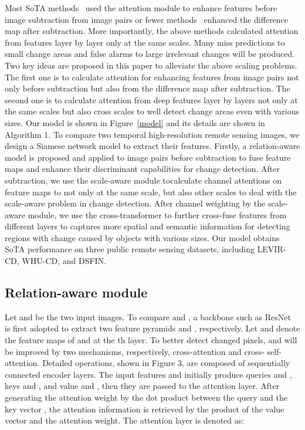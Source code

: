 \documentclass[letterpaper]{article} \usepackage{aaai23}  \usepackage{times}  \usepackage{helvet}  \usepackage{courier}  \usepackage[hyphens]{url}  \usepackage{graphicx} \urlstyle{rm} \def\UrlFont{\rm}  \usepackage{natbib}  \usepackage{caption} \frenchspacing  \setlength{\pdfpagewidth}{8.5in}  \setlength{\pdfpageheight}{11in}  \usepackage{algorithm}
\begin{document}
Most SoTA methods~\cite{Chen2022Transformers,chen2020spatial,DASNet2021} used the attention module to enhance features  before image subtraction from image pairs or fewer methods~\cite{Bai2022Edge} enhanced the difference map after subtraction.  More importantly, the above methods calculated attention from features layer by layer only at the same scales.  Many miss predictions to small change areas and false alarms to large irrelevant changes will be produced. Two key ideas are proposed in this paper to alleviate the above scaling problems.  The first one is to calculate attention for enhancing features from image pairs not only before subtraction but also from the difference map after subtraction. The second one is to calculate attention from deep features layer by layers not only at the same scales but also cross scales to well detect change areas even with various sizes. Our model is shown in Figure~\ref{model} and its details are shown in Algorithm 1. To compare two temporal high-resolution remote sensing images, we design a Siamese network model to extract their features.  Firstly, a relation-aware model is proposed and applied to image pairs before subtraction to fuse feature maps and enhance their discriminant capabilities for change detection. After subtraction,  we use the scale-aware module tocalculate channel attentions on feature maps to not only at the same scale, but also other scales to deal with the scale-aware problem in change detection.  After channel weighting by the scale-aware module,  we use the cross-transformer to further cross-fuse features from different layers to captures more spatial and semantic information for detecting regions with change caused by objects with various sizes. Our model obtains SoTA performance on three public remote sensing datasets, including LEVIR-CD, WHU-CD, and DSFIN.

\subsection{Relation-aware module}
Let  and  be the two input images. 
To compare  and , a backbone such as ResNet~\cite{He_2016_CVPR} is first adopted to extract two feature pyramids  and , respectively. Let  and  denote the feature maps of  and  at the th layer.  To better detect changed pixels,  and  will be improved
by two mechanisms, respectively, cross-attention and cross-
self-attention. Detailed operations, shown in Figure 3,
are composed of sequentially connected encoder layers. The
input features  and  initially produce queries  and , keys  and , and
value  and , then they are passed to the attention layer.  After generating the attention weight by the dot product between the query  and the key vector , the attention information is retrieved by the product of the value vector  and the attention weight. The attention layer is denoted as:
\end{document}

